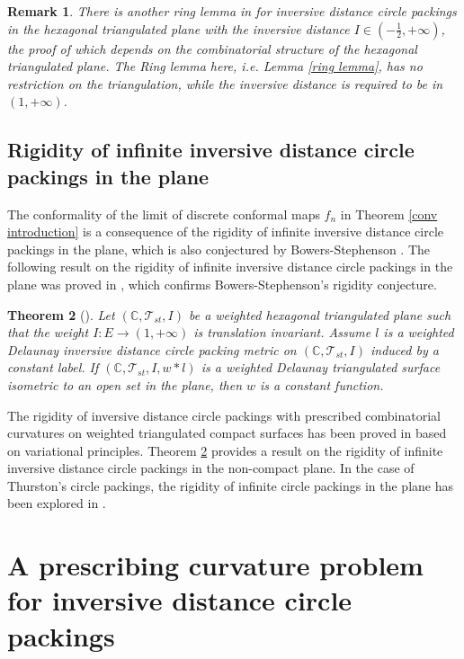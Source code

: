 \documentclass[12pt]{amsart}
\newtheorem{theorem}{Theorem}[section]
\newtheorem{remark}[theorem]{Remark}
\begin{document}
\begin{remark}
  There is another ring lemma in \cite{LXZ} for inversive distance circle packings in the hexagonal triangulated plane with the inversive distance $I\in (-\frac{1}{2}, +\infty)$, the proof of which depends on the combinatorial structure of the hexagonal triangulated plane. The Ring lemma here, i.e. Lemma \ref{ring lemma}, has no restriction on the triangulation, while the inversive distance is required to be in $(1, +\infty)$.
\end{remark}

\subsection{Rigidity of infinite inversive distance circle packings in the plane}
The conformality of the limit of discrete conformal maps $f_n$ in Theorem \ref{conv introduction} is a consequence of the rigidity of infinite inversive distance circle packings in the plane, which is also conjectured by Bowers-Stephenson \cite{BS}.
The following result on the rigidity of infinite inversive distance circle packings in the plane was proved in \cite{LXZ}, which confirms Bowers-Stephenson's rigidity conjecture.


\begin{theorem}[\cite{LXZ}]
\label{infrigidity introduction}
Let $(\mathbb{C}, \mathcal{T}_{st}, I)$ be a weighted hexagonal triangulated plane such that the weight $I: E\rightarrow (1, +\infty)$ is translation invariant.
Assume $l$ is a weighted Delaunay inversive distance circle packing metric on $(\mathbb{C}, \mathcal{T}_{st}, I)$
induced by a constant label.
If $(\mathbb{C}, \mathcal{T}_{st}, I, w*l)$ is a weighted Delaunay triangulated surface isometric to an open set in the plane, then $w$ is a constant function.
\end{theorem}
The rigidity of inversive distance circle packings with prescribed combinatorial curvatures on weighted triangulated compact surfaces has been proved in \cite{Guo,Luo GT,Xu AIM,Xu MRL} based on variational principles. Theorem \ref{infrigidity introduction} provides a result on the rigidity of infinite inversive distance circle packings in the non-compact plane.
In the case of Thurston's circle packings, the rigidity of infinite circle packings in the plane has been explored in \cite{H2, RS, Sch}.




\section{A prescribing curvature problem for inversive distance circle packings}\label{section 3}
\end{document}
